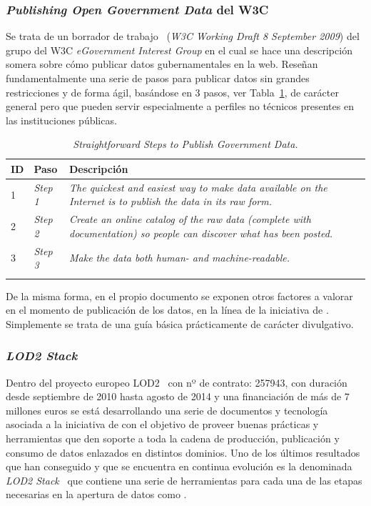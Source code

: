\clearpage

\subsubsection{\textit{Publishing Open Government Data} del W3C}
Se trata de un borrador de trabajo~\cite{publishing-ogd} (\textit{W3C Working Draft 8 September 2009}) del grupo del \gls{W3C} \textit{\gls{eGovernment} Interest Group} en el cual
se hace una descripción somera sobre cómo publicar datos gubernamentales en la web. Reseñan fundamentalmente una serie de pasos 
para publicar datos sin grandes restricciones y de forma ágil, basándose en 3 pasos,
 ver Tabla~\ref{table:publish-ogd}, de carácter general pero que pueden servir especialmente a perfiles
no técnicos presentes en las instituciones públicas.

\begin{longtable}[c]{|l|p{6.5cm}|p{7.5cm}|} 
\hline
  \textbf{ID} & \textbf{Paso} & \textbf{Descripción} \\\hline
\endhead
  1 &  \textit{Step 1} & \textit{The quickest and easiest way to make data available on the Internet is to publish the data in its raw form.}\\ \hline
  2 &  \textit{Step 2} & \textit{Create an online catalog of the raw data (complete with documentation) so people can discover what has been posted.} \\ \hline
  3 &  \textit{Step 3} &   \textit{Make the data both human- and machine-readable.} \\ \hline
\hline
\caption{\textit{Straightforward Steps to Publish Government Data.}}\label{table:publish-ogd}\\    
\end{longtable}

De la misma forma, en el propio documento se exponen otros factores a valorar en el momento
de publicación de los datos, en la línea de la iniciativa de \linkeddata. Simplemente se trata
de una guía básica prácticamente de carácter divulgativo.

\subsubsection{\textit{LOD2 Stack}}\label{lod2-project}
Dentro del proyecto europeo LOD2~\cite{lod2-project} con nº de contrato: 257943, con duración desde septiembre de 2010
hasta agosto de 2014 y una financiación de más de $7$ millones euros se está desarrollando
una serie de documentos y tecnología asociada a la iniciativa de \lod con el objetivo de proveer
buenas prácticas y herramientas que den soporte a toda la cadena de producción, publicación y consumo
de datos enlazados en distintos dominios. Uno de los últimos resultados que han conseguido y que
se encuentra en continua evolución es la denominada \textit{LOD2 Stack}~\cite{lod2-stack} que contiene una
serie de herramientas para cada una de las etapas necesarias en la apertura de datos como \linkeddata.

